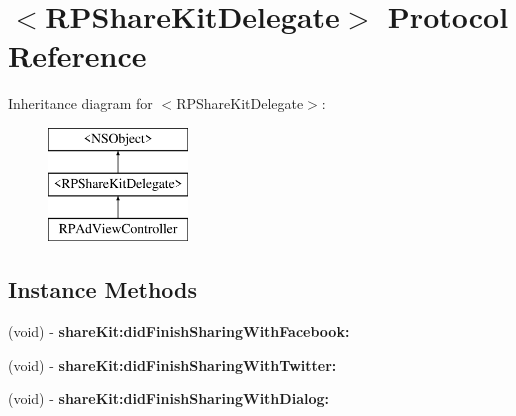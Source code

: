 \hypertarget{protocol_r_p_share_kit_delegate-p}{\section{$<$R\-P\-Share\-Kit\-Delegate$>$ Protocol Reference}
\label{protocol_r_p_share_kit_delegate-p}
}
Inheritance diagram for $<$R\-P\-Share\-Kit\-Delegate$>$\-:\begin{figure}[H]
\begin{center}
\leavevmode
\includegraphics[height=3.000000cm]{protocol_r_p_share_kit_delegate-p}
\end{center}
\end{figure}
\subsection*{Instance Methods}
\begin{DoxyCompactItemize}
\item 
\hypertarget{protocol_r_p_share_kit_delegate-p_a4a007df320e3fc7467a8a71d13ff873a}{(void) -\/ {\bfseries share\-Kit\-:did\-Finish\-Sharing\-With\-Facebook\-:}}\label{protocol_r_p_share_kit_delegate-p_a4a007df320e3fc7467a8a71d13ff873a}

\item 
\hypertarget{protocol_r_p_share_kit_delegate-p_af5853ee81e8746627cf1fec0810d5116}{(void) -\/ {\bfseries share\-Kit\-:did\-Finish\-Sharing\-With\-Twitter\-:}}\label{protocol_r_p_share_kit_delegate-p_af5853ee81e8746627cf1fec0810d5116}

\item 
\hypertarget{protocol_r_p_share_kit_delegate-p_ac58e0f716b7dfd140d6e8f6c9a1806ef}{(void) -\/ {\bfseries share\-Kit\-:did\-Finish\-Sharing\-With\-Dialog\-:}}\label{protocol_r_p_share_kit_delegate-p_ac58e0f716b7dfd140d6e8f6c9a1806ef}

\end{DoxyCompactItemize}
